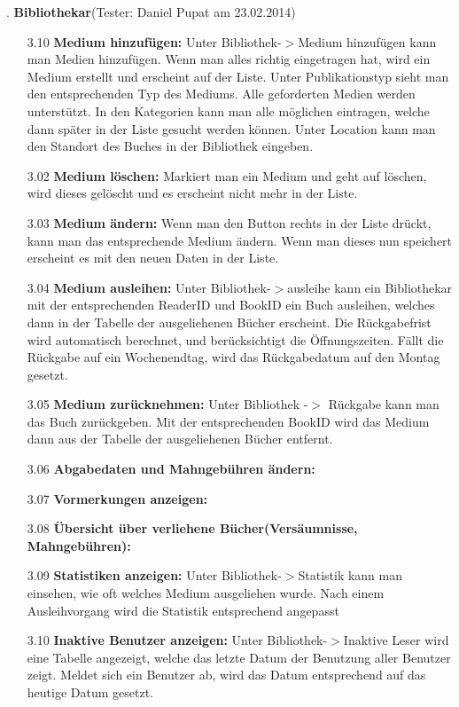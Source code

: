 \documentclass[fontsize=12pt,paper=a4,twoside]{scrartcl}
\begin{document}
. \textbf{Bibliothekar}(Tester: Daniel Pupat am 23.02.2014)\\
\begin{itemize}
\item[3.10]\textbf{Medium hinzufügen:} Unter Bibliothek-$>$Medium hinzufügen kann man Medien hinzufügen. Wenn man alles richtig eingetragen hat, wird ein Medium erstellt und erscheint auf der Liste. Unter Publikationstyp sieht man den entsprechenden Typ des Mediums. Alle geforderten Medien werden unterstützt. In den Kategorien kann man alle möglichen eintragen, welche dann später in der Liste gesucht werden können. Unter Location kann man den Standort des Buches in der Bibliothek eingeben.
\item[3.02]\textbf{Medium löschen:} Markiert man ein Medium und geht auf löschen, wird dieses gelöscht und es erscheint nicht mehr in der Liste.
\item[3.03]\textbf{Medium ändern:} Wenn man den Button rechts in der Liste drückt, kann man das entsprechende Medium ändern. Wenn man dieses nun speichert erscheint es mit den neuen Daten in der Liste.
\item[3.04]\textbf{Medium ausleihen:} Unter Bibliothek-$>$ausleihe kann ein Bibliothekar mit der entsprechenden ReaderID und BookID ein Buch ausleihen, welches dann in der Tabelle der ausgeliehenen Bücher erscheint. Die Rückgabefrist wird automatisch berechnet, und berücksichtigt die Öffnungszeiten. Fällt die Rückgabe auf ein Wochenendtag, wird das Rückgabedatum auf den Montag gesetzt.
\item[3.05]\textbf{Medium zurücknehmen:} Unter Bibliothek -$>$ Rückgabe kann man das Buch zurückgeben. Mit der entsprechenden BookID wird das Medium dann aus der Tabelle der ausgeliehenen Bücher entfernt.
\item[3.06]\textbf{Abgabedaten und Mahngebühren ändern:} 
\item[3.07]\textbf{Vormerkungen anzeigen:}
\item[3.08]\textbf{Übersicht über verliehene Bücher(Versäumnisse, Mahngebühren):}
\item[3.09]\textbf{Statistiken anzeigen:} Unter Bibliothek-$>$Statistik kann man einsehen, wie oft welches Medium ausgeliehen wurde. Nach einem Ausleihvorgang wird die Statistik entsprechend angepasst 
\item[3.10]\textbf{Inaktive Benutzer anzeigen:} Unter Bibliothek-$>$Inaktive Leser wird eine Tabelle angezeigt, welche das letzte Datum der Benutzung aller Benutzer zeigt. Meldet sich ein Benutzer ab, wird das Datum entsprechend auf das heutige Datum gesetzt.

\end{itemize}
\end{document}
